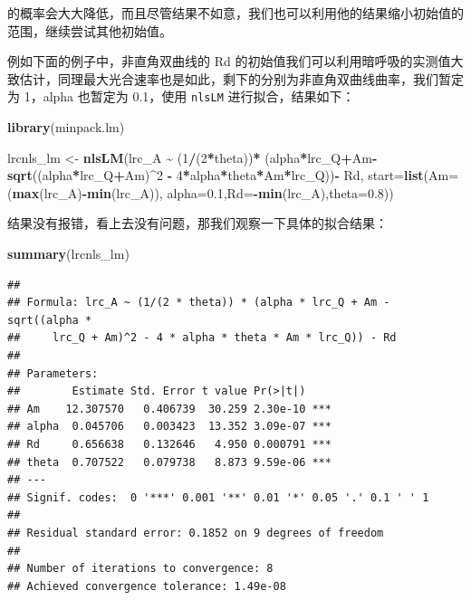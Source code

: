 \documentclass[
]{krantz}
\makeatletter
\newenvironment{Shaded}{\begin{snugshade}}{\end{snugshade}}
\newcommand{\DataTypeTok}[1]{\textcolor[rgb]{0.13,0.29,0.53}{#1}}
\newcommand{\DecValTok}[1]{\textcolor[rgb]{0.00,0.00,0.81}{#1}}
\newcommand{\FloatTok}[1]{\textcolor[rgb]{0.00,0.00,0.81}{#1}}
\newcommand{\KeywordTok}[1]{\textcolor[rgb]{0.13,0.29,0.53}{\textbf{#1}}}
\newcommand{\NormalTok}[1]{#1}
\newcommand{\OperatorTok}[1]{\textcolor[rgb]{0.81,0.36,0.00}{\textbf{#1}}}
\newcommand{\StringTok}[1]{\textcolor[rgb]{0.31,0.60,0.02}{#1}}
\newenvironment{kframe}{%
\medskip{}
\setlength{\fboxsep}{.8em}
 \def\at@end@of@kframe{}%
 \ifinner\ifhmode%
  \def\at@end@of@kframe{\end{minipage}}%
  \begin{minipage}{\columnwidth}%
 \fi\fi%
 \def\FrameCommand##1{\hskip\@totalleftmargin \hskip-\fboxsep
 \colorbox{shadecolor}{##1}\hskip-\fboxsep
     \hskip-\linewidth \hskip-\@totalleftmargin \hskip\columnwidth}%
 \MakeFramed {\advance\hsize-\width
   \@totalleftmargin\z@ \linewidth\hsize
   \@setminipage}}%
 {\par\unskip\endMakeFramed%
 \at@end@of@kframe}
\renewenvironment{Shaded}{\begin{kframe}}{\end{kframe}}
\makeatother
\begin{document}
的概率会大大降低，而且尽管结果不如意，我们也可以利用他的结果缩小初始值的范围，继续尝试其他初始值。

例如下面的例子中，非直角双曲线的 Rd 的初始值我们可以利用暗呼吸的实测值大致估计，同理最大光合速率也是如此，剩下的分别为非直角双曲线曲率，我们暂定为 1，alpha 也暂定为 0.1，使用 \texttt{nlsLM} 进行拟合，结果如下：

\begin{Shaded}
\begin{Highlighting}[]
\KeywordTok{library}\NormalTok{(minpack.lm)}

\NormalTok{lrcnls\_lm \textless{}{-}}\StringTok{ }\KeywordTok{nlsLM}\NormalTok{(lrc\_A }\OperatorTok{\textasciitilde{}}\StringTok{ }\NormalTok{(}\DecValTok{1}\OperatorTok{/}\NormalTok{(}\DecValTok{2}\OperatorTok{*}\NormalTok{theta))}\OperatorTok{*}
\StringTok{        }\NormalTok{(alpha}\OperatorTok{*}\NormalTok{lrc\_Q}\OperatorTok{+}\NormalTok{Am}\OperatorTok{{-}}\KeywordTok{sqrt}\NormalTok{((alpha}\OperatorTok{*}\NormalTok{lrc\_Q}\OperatorTok{+}\NormalTok{Am)}\OperatorTok{\^{}}\DecValTok{2} \OperatorTok{{-}}\StringTok{ }
\StringTok{        }\DecValTok{4}\OperatorTok{*}\NormalTok{alpha}\OperatorTok{*}\NormalTok{theta}\OperatorTok{*}\NormalTok{Am}\OperatorTok{*}\NormalTok{lrc\_Q))}\OperatorTok{{-}}\StringTok{ }
\StringTok{        }\NormalTok{Rd, }\DataTypeTok{start=}\KeywordTok{list}\NormalTok{(}\DataTypeTok{Am=}\NormalTok{(}\KeywordTok{max}\NormalTok{(lrc\_A)}\OperatorTok{{-}}\KeywordTok{min}\NormalTok{(lrc\_A)),}
        \DataTypeTok{alpha=}\FloatTok{0.1}\NormalTok{,}\DataTypeTok{Rd=}\OperatorTok{{-}}\KeywordTok{min}\NormalTok{(lrc\_A),}\DataTypeTok{theta=}\FloatTok{0.8}\NormalTok{)) }
\end{Highlighting}
\end{Shaded}

结果没有报错，看上去没有问题，那我们观察一下具体的拟合结果：

\begin{Shaded}
\begin{Highlighting}[]
\KeywordTok{summary}\NormalTok{(lrcnls\_lm)}
\end{Highlighting}
\end{Shaded}

\begin{verbatim}
## 
## Formula: lrc_A ~ (1/(2 * theta)) * (alpha * lrc_Q + Am - sqrt((alpha * 
##     lrc_Q + Am)^2 - 4 * alpha * theta * Am * lrc_Q)) - Rd
## 
## Parameters:
##        Estimate Std. Error t value Pr(>|t|)    
## Am    12.307570   0.406739  30.259 2.30e-10 ***
## alpha  0.045706   0.003423  13.352 3.09e-07 ***
## Rd     0.656638   0.132646   4.950 0.000791 ***
## theta  0.707522   0.079738   8.873 9.59e-06 ***
## ---
## Signif. codes:  0 '***' 0.001 '**' 0.01 '*' 0.05 '.' 0.1 ' ' 1
## 
## Residual standard error: 0.1852 on 9 degrees of freedom
## 
## Number of iterations to convergence: 8 
## Achieved convergence tolerance: 1.49e-08
\end{verbatim}
\end{document}
